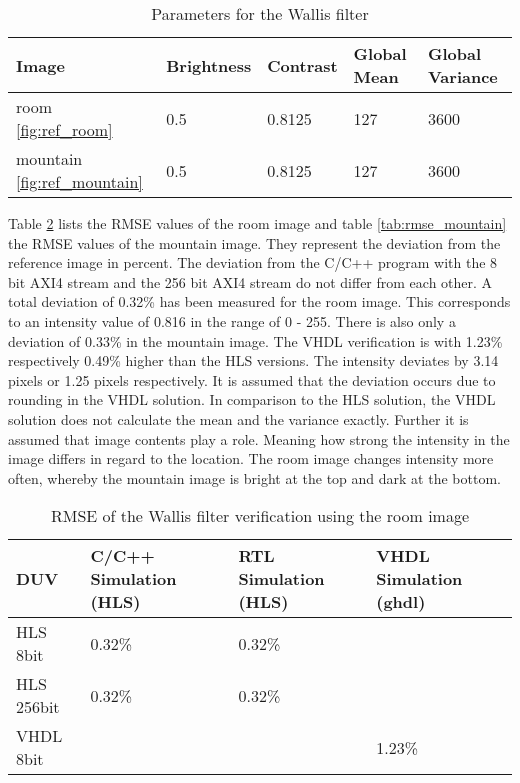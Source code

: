\begin{table}[tb!]
    \centering
    \begin{tabular}{l l l l l}
        \toprule
        Image & Brightness & Contrast & Global Mean & Global Variance \\
        \midrule
        room \ref{fig:ref_room} & 0.5 & 0.8125 & 127 & 3600 \\
        mountain \ref{fig:ref_mountain} & 0.5 & 0.8125 & 127 & 3600 \\
        \bottomrule
    \end{tabular}
    \caption{Parameters for the Wallis filter}
    \label{tab:parameter}
\end{table}



Table \ref{tab:rmse_room} lists the RMSE values of the room image and table 
\ref{tab:rmse_mountain} the RMSE
values of the mountain image. They
represent the deviation from the reference image in percent. The deviation from
the C/C++ program with the 8 bit AXI4 stream and the 256 bit AXI4 stream do
not differ from each other. A total deviation of 0.32\% has been measured for
the
room image. This corresponds to an intensity value of 0.816 in the range of 0 -
255. There is also only a deviation of 0.33\% in the mountain image. The VHDL
verification is with 1.23\% respectively 0.49\% higher than the
HLS versions. The intensity deviates by 3.14 pixels or 1.25 pixels respectively.
It is assumed that the deviation occurs due to rounding in the VHDL solution. In
comparison to the HLS solution, the VHDL solution does not calculate the mean
and the variance exactly. Further it is assumed that image contents play a
role. Meaning how strong the intensity in the image differs in regard to the
location. The room image changes intensity more often, whereby the mountain
image is bright at the top and dark at the bottom.

\begin{table}[tb!]
    \centering
    \begin{tabular}{l l l l}
        \toprule
        DUV & C/C++ Simulation (HLS) & RTL Simulation (HLS) & VHDL Simulation (ghdl) \\
        \midrule
        HLS  8bit    & 0.32\%    & 0.32\%    & {}\\
        HLS  256bit  & 0.32\%    & 0.32\%    & {} \\
        VHDL 8bit        & {}         & {}         & 1.23\% \\
        \bottomrule
    \end{tabular}
    \caption{RMSE of the Wallis filter verification using the room image}
    \label{tab:rmse_room}
\end{table}

